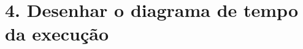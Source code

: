 \documentclass[12pt]{article}
\begin{document}
\section*{4. Desenhar o diagrama de tempo da execução}

\begin{figure}[H]

	\begin{center}



		\label{img:diag}

	\end{center}

\end{figure}
\end{document}
